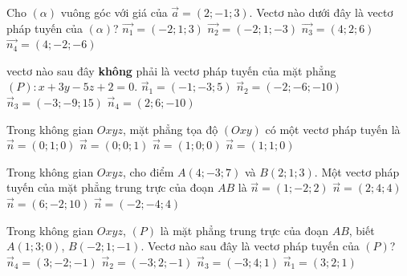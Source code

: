 \begin{ex}
	Cho $(\alpha)$ vuông góc với giá của $\vec{a}=(2;-1;3)$. Vectơ nào dưới đây là vectơ pháp tuyến của $(\alpha)$?
	\choice
	{$\vec{n_1}=(-2;1;3)$}
	{\True $\vec{n_2}=(-2;1;-3)$}
	{$\vec{n_3}=(4;2;6)$}
	{$\vec{n_4}=(4;-2;-6)$}
\end{ex}

\begin{ex}%
	vectơ nào sau đây \textbf{không} phải là vectơ pháp tuyến của mặt phẳng $(P):x+3y-5z+2=0$.
	\choice
	{$\overrightarrow{n}_1=(-1;-3;5)$}
	{\True $\overrightarrow{n}_2=(-2;-6;-10)$}
	{$\overrightarrow{n}_3=(-3;-9;15)$}
	{$\overrightarrow{n}_4=(2;6;-10)$}
\end{ex}

\begin{ex}
	Trong không gian  $Oxyz$, mặt phẳng tọa độ $(Oxy)$ có một vectơ pháp tuyến là
	\choice
	{$\overrightarrow{n}=(0;1;0)$}
	{\True $\overrightarrow{n}=(0;0;1)$}
	{$\overrightarrow{n}=(1;0;0)$}
	{$\overrightarrow{n}=(1;1;0)$}
\end{ex}

\begin{ex}
	Trong không gian $Oxyz$, cho điểm $A(4;-3;7)$ và $B(2;1;3)$. Một vectơ pháp tuyến của mặt phẳng trung trực của đoạn $AB$ là
	\choice
	{\True $\vec{n}=(1;-2;2)$}
	{$\vec{n}=(2;4;4)$}
	{$\vec{n}=(6;-2;10)$}
	{$\vec{n}=(-2;-4;4)$}
\end{ex}

\begin{ex}%
	Trong không gian $Oxyz$, $(P)$ là mặt phẳng trung trực của đoạn $AB$, biết $A(1;3;0)$, $B(-2;1;-1)$. Vectơ nào sau đây là vectơ pháp tuyến của $(P)$?
	\choice
	{$\overrightarrow{n}_4=(3;-2;-1)$}
	{$\overrightarrow{n}_2=(-3;2;-1)$}
	{$\overrightarrow{n}_3=(-3;4;1)$}
	{\True $\overrightarrow{n}_1=(3;2;1)$}
\end{ex}

